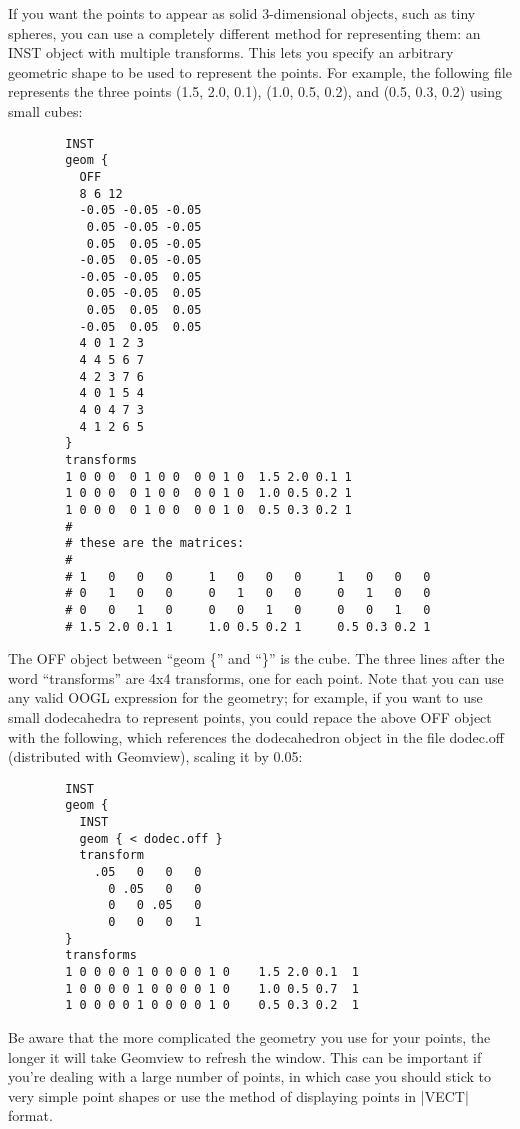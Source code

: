 \documentclass[12pt,a4paper]{article}
\begin{document}
        If you want the points to appear as solid 3-dimensional objects, such as
        tiny spheres, you can use a completely different method for representing
        them: an INST object with multiple transforms. This lets you specify an
        arbitrary geometric shape to be used to represent the points. For
        example, the following file represents the three points (1.5, 2.0, 0.1),
        (1.0, 0.5, 0.2), and (0.5, 0.3, 0.2) using small cubes:
        \begin{verbatim}
        INST
        geom {
          OFF
          8 6 12
          -0.05 -0.05 -0.05
           0.05 -0.05 -0.05
           0.05  0.05 -0.05
          -0.05  0.05 -0.05
          -0.05 -0.05  0.05
           0.05 -0.05  0.05
           0.05  0.05  0.05
          -0.05  0.05  0.05
          4 0 1 2 3
          4 4 5 6 7
          4 2 3 7 6
          4 0 1 5 4
          4 0 4 7 3
          4 1 2 6 5
        }
        transforms
        1 0 0 0  0 1 0 0  0 0 1 0  1.5 2.0 0.1 1
        1 0 0 0  0 1 0 0  0 0 1 0  1.0 0.5 0.2 1
        1 0 0 0  0 1 0 0  0 0 1 0  0.5 0.3 0.2 1
        #
        # these are the matrices:
        #
        # 1   0   0   0     1   0   0   0     1   0   0   0
        # 0   1   0   0     0   1   0   0     0   1   0   0
        # 0   0   1   0     0   0   1   0     0   0   1   0
        # 1.5 2.0 0.1 1     1.0 0.5 0.2 1     0.5 0.3 0.2 1
        \end{verbatim}
        The OFF object between ``geom \{'' and ``\}'' is the cube. The three lines
        after the word ``transforms'' are 4x4 transforms, one for each point. Note
        that you can use any valid OOGL expression for the geometry; for
        example, if you want to use small dodecahedra to represent points, you
        could repace the above OFF object with the following, which references
        the dodecahedron object in the file dodec.off (distributed with
        Geomview), scaling it by 0.05:
        \begin{verbatim}
        INST
        geom {
          INST
          geom { < dodec.off }
          transform
            .05   0   0   0
              0 .05   0   0
              0   0 .05   0
              0   0   0   1
        }
        transforms
        1 0 0 0 0 1 0 0 0 0 1 0    1.5 2.0 0.1  1
        1 0 0 0 0 1 0 0 0 0 1 0    1.0 0.5 0.7  1
        1 0 0 0 0 1 0 0 0 0 1 0    0.5 0.3 0.2  1
        \end{verbatim}
        Be aware that the more complicated the geometry you use for your points,
        the longer it will take Geomview to refresh the window. This can be
        important if you're dealing with a large number of points, in which case
        you should stick to very simple point shapes or use the method of
        displaying points in |VECT| format.
\end{document}
